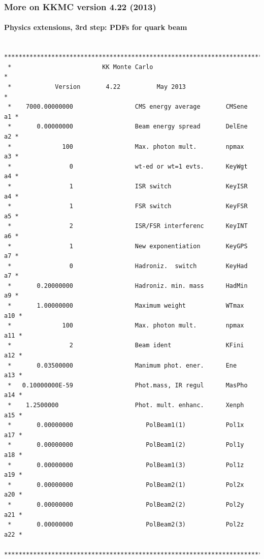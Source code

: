 \documentclass{beamer}
\begin{document}
\begin{frame}[fragile]
\frametitle{\bf More on KKMC version 4.22 (2013)}
\framesubtitle{\bf\large Physics extensions, 3rd step: PDFs for quark beam}

{\tiny
\baselineskip=3pt
\begin{verbatim}
 ***************************************************************************
 *                         KK Monte Carlo                                  *
 *            Version       4.22          May 2013                         *
 *    7000.00000000                 CMS energy average       CMSene     a1 *
 *       0.00000000                 Beam energy spread       DelEne     a2 *
 *              100                 Max. photon mult.        npmax      a3 *
 *                0                 wt-ed or wt=1 evts.      KeyWgt     a4 *
 *                1                 ISR switch               KeyISR     a4 *
 *                1                 FSR switch               KeyFSR     a5 *
 *                2                 ISR/FSR interferenc      KeyINT     a6 *
 *                1                 New exponentiation       KeyGPS     a7 *
 *                0                 Hadroniz.  switch        KeyHad     a7 *
 *       0.20000000                 Hadroniz. min. mass      HadMin     a9 *
 *       1.00000000                 Maximum weight           WTmax     a10 *
 *              100                 Max. photon mult.        npmax     a11 *
 *                2                 Beam ident               KFini     a12 *
 *       0.03500000                 Manimum phot. ener.      Ene       a13 *
 *   0.10000000E-59                 Phot.mass, IR regul      MasPho    a14 *
 *    1.2500000                     Phot. mult. enhanc.      Xenph     a15 *
 *       0.00000000                    PolBeam1(1)           Pol1x     a17 *
 *       0.00000000                    PolBeam1(2)           Pol1y     a18 *
 *       0.00000000                    PolBeam1(3)           Pol1z     a19 *
 *       0.00000000                    PolBeam2(1)           Pol2x     a20 *
 *       0.00000000                    PolBeam2(2)           Pol2y     a21 *
 *       0.00000000                    PolBeam2(3)           Pol2z     a22 *
 ***************************************************************************
  

\end{verbatim}}
\end{frame}
\end{document}
